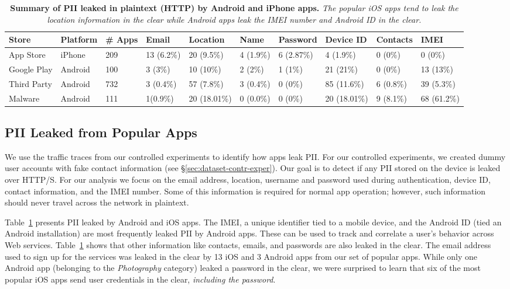 \begin{table}[t]    
    \centering
    \begin{small}
    \begin{tabular}{|l|l|l|l|l|l|l|l|l|l|}
       \hline
       {\bf Store}&{\bf Platform}&{\bf \# Apps}&{\bf Email}& {\bf Location}& {\bf Name} &{\bf Password}& {\bf Device ID}& {\bf Contacts}& {\bf IMEI}\\
       \hline
       App Store&iPhone&209&13 (6.2\%) &20 (9.5\%)&4 (1.9\%)&6 (2.87\%)&4 (1.9\%)&0 (0\%)&0 (0\%)\\
       \hline
       Google Play&Android&100&3 (3\%)&10 (10\%)&2 (2\%)&1 (1\%)&21 (21\%)&0 (0\%)&13 (13\%)\\
       \hline
       Third Party&Android&732&3 (0.4\%)&57 (7.8\%)&3 (0.4\%)&0 (0\%)&85 (11.6\%)&6 (0.8\%)&39 (5.3\%)\\
       \hline
       Malware&Android&111&1(0.9\%)&20 (18.01\%)&0 (0.0\%)&0 (0\%)&20 (18.01\%)&9 (8.1\%)&68 (61.2\%)\\ 
       \hline  
    \end{tabular}
    \end{small}
    \caption{\textbf{Summary of PII leaked in plaintext (HTTP) by Android and iPhone apps.} \emph{The popular iOS apps tend to leak the location information in the clear while Android apps leak the IMEI number and Android ID in the clear.}}
    \vspace{\postfigspace}
    \label{tab:pii}
\end{table}

\subsection{PII Leaked from Popular Apps}
\label{subsec:exptpii}

We use the traffic traces from our controlled experiments to identify how apps leak PII. 
For our controlled experiments, we created dummy user accounts with fake contact information (see \S\ref{sec:dataset-contr-exper}).  
Our goal is to detect if any PII stored on the device is leaked over HTTP/S.
For our analysis we focus on the email address, location, username and password used during authentication, device ID, contact information, and the IMEI number. 
Some of this information is required for normal app operation; however, such information should never travel across the network in plaintext.  

Table~\ref{tab:pii} presents PII leaked by Android and iOS apps. 
The IMEI, a unique identifier tied to a mobile device, and the Android ID (tied an Android installation) are most frequently leaked PII by Android apps.  
These can be used to track and correlate a user's behavior across Web services. 
Table~\ref{tab:pii} shows that other information like contacts, emails, and passwords are also leaked in the clear. 
The email address used to sign up for the services was leaked in the clear by 13 iOS and 3 Android apps from our set of popular apps.
While only one Android app (belonging to the \emph{Photography} category) leaked a password in the clear, we were surprised to learn that six of the most popular iOS apps send user credentials in the clear, \emph{including the password}. 

